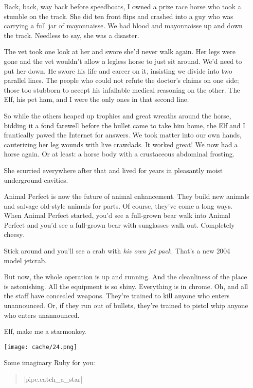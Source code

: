\documentclass[12pt,twoside]{report}
\begin{document}
Back, back, way back before speedboats, I owned a prize race horse who
took a stumble on the track.  She did ten front flips and crashed into
a guy who was carrying a full jar of mayonnaisse.  We had blood and
mayonnaisse up and down the track.  Needless to say, she was a
disaster.

The vet took one look at her and swore she'd never walk again.  Her
legs were gone and the vet wouldn't allow a legless horse to just sit
around.  We'd need to put her down.  He swore his life and career on
it, insisting we divide into two parallel lines.  The people who could
not refute the doctor's claims on one side; those too stubborn to
accept his infallable medical reasoning on the other.  The Elf, his
pet ham, and I were the only ones in that second line.

So while the others heaped up trophies and great wreaths around the
horse, bidding it a fond farewell before the bullet came to take him
home, the Elf and I frantically pawed the Internet for answers.  We
took matter into our own hands, cauterizing her leg wounds with live
crawdads.  It worked great!  We now had a horse again.  Or at least: a
horse body with a crustaceous abdominal frosting.

She scurried everywhere after that and lived for years in pleasantly
moist underground cavities.

Animal Perfect is now the future of animal enhancement.  They build
new animals and salvage old-style animals for parts.  Of course,
they've come a long ways. When Animal Perfect started, you'd see a
full-grown bear walk into Animal Perfect and you'd see a full-grown
bear with sunglasses walk out.  Completely cheesy.

Stick around and you'll see a crab with {\em his own jet pack}.
That's a new 2004 model jetcrab.

But now, the whole operation is up and running.  And the cleanliness
of the place is astonishing. All the equipment is so shiny.
Everything is in chrome.  Oh, and all the staff have concealed
weapons.  They're trained to kill anyone who enters unannounced.  Or,
if they run out of bullets, they're trained to pistol whip anyone who
enters unannounced.

Elf, make me a starmonkey.

	\texttt{[image: cache/24.png]}

Some imaginary Ruby for you:

\begin{quote}
\rubyinline|pipe.catch_a_star|\end{quote}
\end{document}
